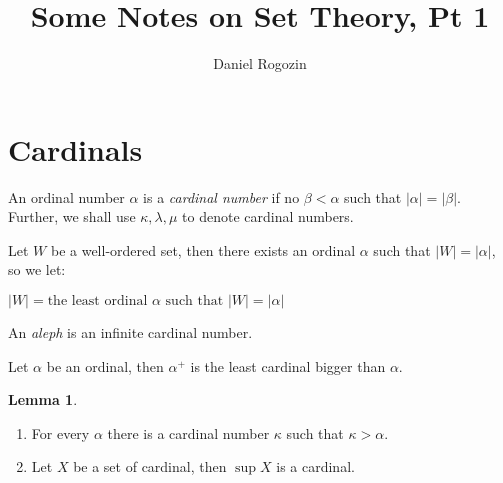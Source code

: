 \documentclass[8pt]{article}
\title{Some Notes on Set Theory, Pt 1}
\author{Daniel Rogozin}
\date{ }
\theoremstyle{definition}
\theoremstyle{definition}
\theoremstyle{definition}
\theoremstyle{definition}
\theoremstyle{definition}
\theoremstyle{definition}
\theoremstyle{definition}
\theoremstyle{definition}
\newtheorem{lemma}{Lemma}[section]
\theoremstyle{definition}
\theoremstyle{definition}
\theoremstyle{definition}
\theoremstyle{definition}
\theoremstyle{definition}
\theoremstyle{definition}
\theoremstyle{question}
\begin{document}
\maketitle

\tableofcontents

\newpage

\section{Cardinals}

An ordinal number $\alpha$ is a \emph{cardinal number} if no $\beta < \alpha$ such that $|\alpha| = |\beta|$.
Further, we shall use $\kappa, \lambda, \mu$ to denote cardinal numbers.

Let $W$ be a well-ordered set, then there exists an ordinal $\alpha$ such that $|W| = |\alpha|$, so we let:
\begin{center}
  $|W| = \text{the least ordinal $\alpha$ such that $|W| = |\alpha|$}$
\end{center}

An \emph{aleph} is an infinite cardinal number. 

Let $\alpha$ be an ordinal, then $\alpha^+$ is the least cardinal bigger than $\alpha$.

\begin{lemma}
  $ $

  \begin{enumerate}
    \item For every $\alpha$ there is a cardinal number $\kappa$ such that $\kappa > \alpha$.
    \item Let $X$ be a set of cardinal, then $\sup X$ is a cardinal.
  \end{enumerate}
\end{lemma}
\end{document}
